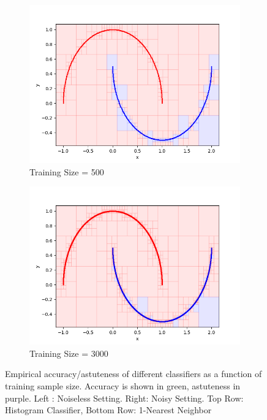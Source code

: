 \begin{figure}
\medskip
\begin{subfigure}{0.45\textwidth}
\includegraphics[width=\linewidth]{visual500}
\caption{Training Size = 500} \label{fig:a}
\end{subfigure}\hspace*{\fill}
\begin{subfigure}{0.45\textwidth}
\includegraphics[width=\linewidth]{visual3000}
\caption{Training Size = 3000} \label{fig:b}
\end{subfigure}

\caption{Empirical accuracy/astuteness of different classifiers as a function of training sample size. Accuracy is shown in green, astuteness in purple. Left : Noiseless Setting. Right: Noisy Setting. Top Row: Histogram Classifier, Bottom Row: 1-Nearest Neighbor} \label{fig:1}
\end{figure}

